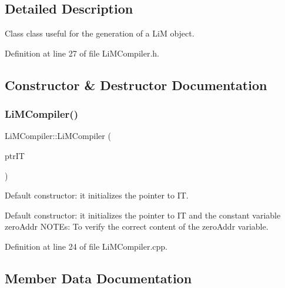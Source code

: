 \subsection{Detailed Description}
Class class useful for the generation of a LiM object. 

Definition at line 27 of file Li\+M\+Compiler.\+h.



\subsection{Constructor \& Destructor Documentation}
\mbox{\label{classoctantis_1_1LiMCompiler_a5bd2a38da7d74bfd9f990a50dc86d2e6}} 
\subsubsection{\texorpdfstring{Li\+M\+Compiler()}{LiMCompiler()}}
{\footnotesize\ttfamily Li\+M\+Compiler\+::\+Li\+M\+Compiler (\begin{DoxyParamCaption}\item[{\hyperlink{classoctantis_1_1InstructionTable}{Instruction\+Table} \&}]{ptr\+IT }\end{DoxyParamCaption})}



Default constructor\+: it initializes the pointer to IT. 

Default constructor\+: it initializes the pointer to IT and the constant variable zero\+Addr N\+O\+T\+Es\+: To verify the correct content of the zero\+Addr variable. 

Definition at line 24 of file Li\+M\+Compiler.\+cpp.



\subsection{Member Data Documentation}
\mbox{\label{classoctantis_1_1LiMCompiler_af1779840f74fcbf74bdd7973082ed64d}} 
